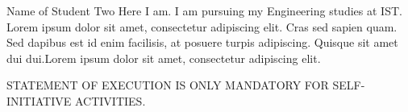 \documentclass[a4paper,12pt,journal,twoside,compsoc]{PPIEEEtran}
\begin{document}
\begin{IEEEbiography}
{Name of Student Two}
Here I am. I am pursuing my Engineering studies at \ac{IST}. Lorem ipsum dolor sit amet, consectetur adipiscing elit. Cras sed sapien quam. Sed dapibus est id enim facilisis, at posuere turpis adipiscing. Quisque sit amet dui dui.Lorem ipsum dolor sit amet, consectetur adipiscing elit. 
\end{IEEEbiography}
\newpage
\onecolumn
STATEMENT OF EXECUTION IS ONLY MANDATORY FOR SELF-INITIATIVE ACTIVITIES.
\end{document}
